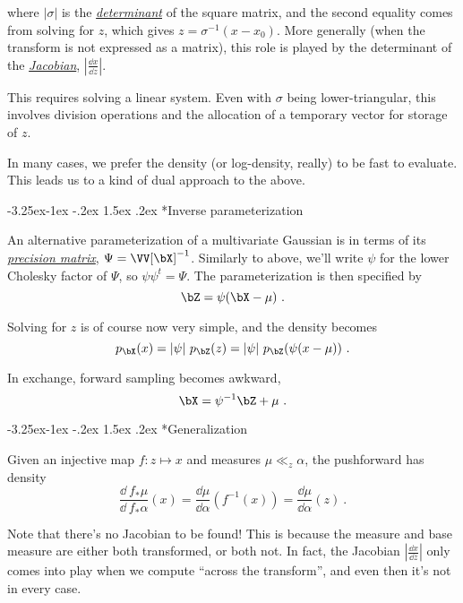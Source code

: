 \documentclass{juliacon}
\makeatletter
\renewcommand\subsection{\@startsection{subsection}{2}{\z@}%
{-3.25ex\@plus -1ex \@minus -.2ex}%
{1.5ex \@plus .2ex}%
{\normalfont\bfseries}}
\makeatother
\begin{document}
where $|\sigma|$ is the \href{https://en.wikipedia.org/wiki/Determinant}{\emph{determinant}} of the square matrix, and the second equality comes from solving for $z$, which gives $z=\sigma^{-1}(x-x_0)$. More generally (when the transform is not expressed as a matrix), this role is played by the determinant of the \href{https://en.wikipedia.org/wiki/Jacobian_matrix_and_determinant}{\emph{Jacobian}}, $\left|\frac{\dd x}{\dd z}\right|$.

This requires solving a linear system. Even with $\sigma$ being lower-triangular, this involves division operations and the allocation of a temporary vector for storage of $z$.

In many cases, we prefer the density (or log-density, really) to be fast to evaluate. This leads us to a kind of dual approach to the above.

\subsection*{Inverse parameterization}

An alternative parameterization of a multivariate Gaussian is in terms of its \href{https://en.wikipedia.org/wiki/Precision_(statistics)}{\emph{precision matrix}}, $\Psi = \VV[\bX]^{-1}$. Similarly to above, we'll write $\psi$ for the lower Cholesky factor of $\Psi$, so $\psi \psi^t = \Psi$. The parameterization is then specified by
\[
\bZ = \psi(\bX - \mu)\ .
\]

Solving for $z$ is of course now very simple, and the density becomes
\[
p_\bX(x) = |\psi|\ p_\bZ(z) = |\psi|\ p_\bZ(\psi (x - \mu))\ .
\]

In exchange, forward sampling becomes awkward,
\[
\bX = \psi^{-1}\bZ + \mu\ .
\]

\subsection*{Generalization}

Given an injective map $f\colon z \mapsto x$ and measures $\mu \ll_z \alpha$, the pushforward has density
\[
\frac{\dd\ f_*\mu}{\dd\ f_*\alpha}(x) 
= \frac{\dd \mu}{\dd \alpha}\left(f^{-1}(x)\right) 
= \frac{\dd \mu}{\dd \alpha}(z)\ .
\]

Note that there's no Jacobian to be found! This is because the measure and base measure are either both transformed, or both not. In fact, the Jacobian $\left|\frac{\dd x}{\dd z}\right|$ only comes into play when we compute ``across the transform'', and even then it's not in every case.
\end{document}
